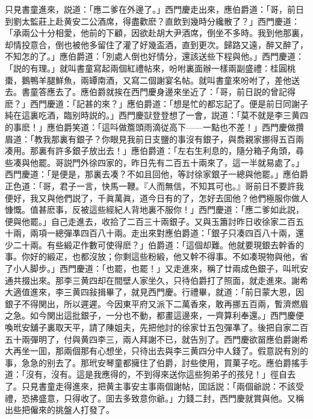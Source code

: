 只見書童進來，説道：「應二爹在外邊了。」西門慶走出來，應伯爵道：「哥，前日到劉太監莊上赴黄安二公酒席，得盡歡麽？直飲到幾時分纔散了？」西門慶道：「承兩公十分相愛，他前的下顧，因欲赴胡大尹酒席，倒坐不多時。我到他那裏，却情投意合，倒也被他多留住了灌了好幾盃酒，直到更次。歸路又遠，醉又醉了，不知怎的了。」應伯爵道：「別處人倒也好情分，還該送些下程與他。」西門慶道：「説的有理。」就叫書童寫起兩個紅禮帖來，吩咐裏面辦一樣兩副盛禮：桂圓桃棗，鵝鴨羊腿鮮魚，兩罈南酒，又寫二個謝宴名帖。就叫書童來吩咐了，差他送去。書童答應去了。應伯爵就挨在西門慶身邊來坐近了：「哥，前日説的曾記得麽？」西門慶道：「記甚的來？」應伯爵道：「想是忙的都忘記了。便是前日同謝子純在這裏吃酒，臨别時説的。」西門慶獃登登想了一會，説道：「莫不就是李三黄四的事麽！」應伯爵笑道：「這呌做簷頭雨滴従高下——一點也不差！」西門慶做攢眉道：「教我那裏有銀子？你眼見我前日支鹽的事沒有銀子，與喬親家挪得五百兩凑用。那裏有許多銀子放出去！」應伯爵道：「左右生利息的，隨分箱子角頭，尋些凑與他罷。哥説門外徐四家的，昨日先有二百五十兩來了，這一半就易處了。」西門慶道：「是便是，那裏去凑？不如且回他，等討徐家銀子一總與他罷。」應伯爵正色道：「哥，君子一言，快馬一鞭。『人而無信，不知其可也。』哥前日不要許我便好，我又與他們説了，千眞萬眞，道今日有的了，怎好去囬他？他們極服你做人慷慨。值甚麽事，反被這些經紀人背地裏不服你！」西門慶道：「應二爹如此説，便與他罷。」自己走進去，收拾了二百三十兩銀子。又與玉簫討昨日收徐家二百五十兩，兩項一總彈凖四百八十兩。走出來對應伯爵道：「銀子只凑四百八十兩，還少二十兩。有些緞疋作數可使得麽？」伯爵道：「這個却難。他就要現銀去幹香的事。你好的緞疋，也都沒放；你剩這些粉緞，他又幹不得事。不如凑現物與他，省了小人脚步。」西門慶道：「也罷，也罷！」又走進來，稱了廿兩成色銀子，叫玳安通共掇出來。那李三黄四却在間壁人家坐久，只待伯爵打了照面，就走進來。謝希大適值進來，李三黄四敍揖畢了，就見西門慶。行禮畢，就道：「前日蒙大恩，因銀子不得関出，所以遲遲。今因東平府又派下二萬香來，敢再挪五百兩，暫濟燃眉之急。如今関出這批銀子，一分也不動，都畫這邊來，一齊算利奉還。」西門慶便喚玳安舖子裏取天平，請了陳姐夫，先把他討的徐家廿五包彈凖了。後把自家二百五十兩彈明了，付與黄四李三，兩人拜謝不已，就告別了。西門慶欲㽞應伯爵謝希大再坐一囬，那兩個那有心想坐，只待出去與李三黄四分中人錢了。假意説有別的事，急急的别去了。那玳安琴童都擁住了伯爵，討些使用，買菓子吃。應伯爵搖手道：「沒有，沒有。這是我應得的，不到得來送你這些狗弟子的孩兒！」徑自去了。只見書童走得進來，把黄主事安主事兩個謝帖，囬話説：「兩個爺説：不該受禮，恐拂盛意，只得收了。囬去多致意你爺。」力錢二封，西門慶就賞與他。又稱出些把僱來的挑盤人打發了。


